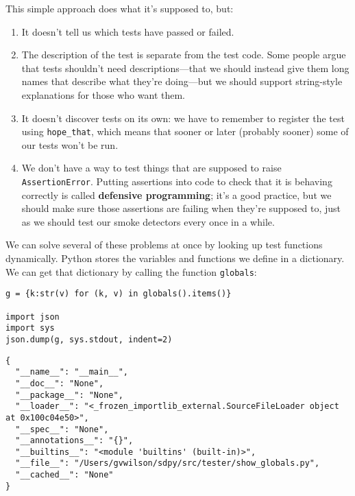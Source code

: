 \documentclass{scrbook}
\newcommand{\glossref}[1]{\textbf{#1}}
\begin{document}
This simple approach does what it's supposed to, but:

\begin{enumerate}

\item 

It doesn't tell us which tests have passed or failed.



\item 

The description of the test is separate from the test code.
    Some people argue that tests shouldn't need descriptions—that
    we should instead give them long names that describe what they're doing—but
    we should support string-style explanations for those who want them.



\item 

It doesn't discover tests on its own:
    we have to remember to register the test using \texttt{hope\_that},
    which means that sooner or later (probably sooner)
    some of our tests won't be run.



\item 

We don't have a way to test things that are supposed to raise \texttt{AssertionError}.
    Putting assertions into code to check that it is behaving correctly
    is called \glossref{defensive programming};
    it's a good practice,
    but we should make sure those assertions are failing when they're supposed to,
    just as we should test our smoke detectors every once in a while.



\end{enumerate}


We can solve several of these problems at once by looking up test functions dynamically.
Python stores the variables and functions we define in a dictionary.
We can get that dictionary by calling the function \texttt{globals}:


\begin{lstlisting}[frame=single,frameround=tttt]
g = {k:str(v) for (k, v) in globals().items()}

import json
import sys
json.dump(g, sys.stdout, indent=2)
\end{lstlisting}



\begin{lstlisting}[frame=single,frameround=tttt]
{
  "__name__": "__main__",
  "__doc__": "None",
  "__package__": "None",
  "__loader__": "<_frozen_importlib_external.SourceFileLoader object at 0x100c04e50>",
  "__spec__": "None",
  "__annotations__": "{}",
  "__builtins__": "<module 'builtins' (built-in)>",
  "__file__": "/Users/gvwilson/sdpy/src/tester/show_globals.py",
  "__cached__": "None"
}
\end{lstlisting}
\end{document}
